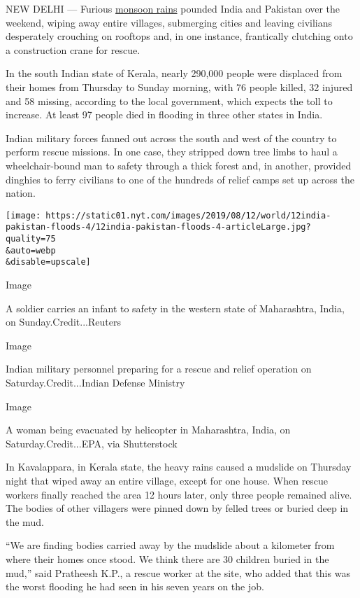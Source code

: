 NEW DELHI --- Furious
\href{https://www.nytimes.com/2020/07/15/world/asia/monsoon-asia-bangladesh-india.html}{monsoon
rains} pounded India and Pakistan over the weekend, wiping away entire
villages, submerging cities and leaving civilians desperately crouching
on rooftops and, in one instance, frantically clutching onto a
construction crane for rescue.

In the south Indian state of Kerala, nearly 290,000 people were
displaced from their homes from Thursday to Sunday morning, with 76
people killed, 32 injured and 58 missing, according to the local
government, which expects the toll to increase. At least 97 people died
in flooding in three other states in India.

Indian military forces fanned out across the south and west of the
country to perform rescue missions. In one case, they stripped down tree
limbs to haul a wheelchair-bound man to safety through a thick forest
and, in another, provided dinghies to ferry civilians to one of the
hundreds of relief camps set up across the nation.

\texttt{[image: https://static01.nyt.com/images/2019/08/12/world/12india-pakistan-floods-4/12india-pakistan-floods-4-articleLarge.jpg?quality=75\\\&auto=webp\\\&disable=upscale]}

Image

A soldier carries an infant to safety in the western state of
Maharashtra, India, on Sunday.Credit...Reuters

Image

Indian military personnel preparing for a rescue and relief operation on
Saturday.Credit...Indian Defense Ministry

Image

A woman being evacuated by helicopter in Maharashtra, India, on
Saturday.Credit...EPA, via Shutterstock

In Kavalappara, in Kerala state, the heavy rains caused a mudslide on
Thursday night that wiped away an entire village, except for one house.
When rescue workers finally reached the area 12 hours later, only three
people remained alive. The bodies of other villagers were pinned down by
felled trees or buried deep in the mud.

``We are finding bodies carried away by the mudslide about a kilometer
from where their homes once stood. We think there are 30 children buried
in the mud,'' said Pratheesh K.P., a rescue worker at the site, who
added that this was the worst flooding he had seen in his seven years on
the job.

